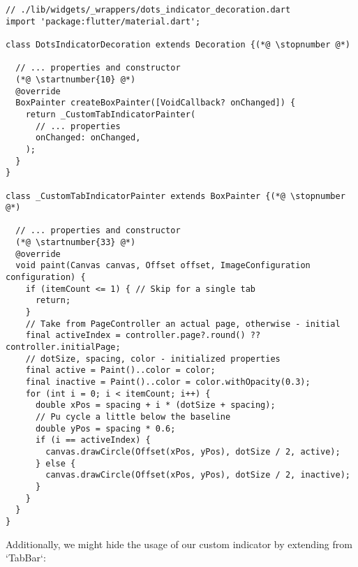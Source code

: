 \begin{lstlisting}
// ./lib/widgets/_wrappers/dots_indicator_decoration.dart
import 'package:flutter/material.dart';

class DotsIndicatorDecoration extends Decoration {(*@ \stopnumber @*)

  // ... properties and constructor
  (*@ \startnumber{10} @*)
  @override
  BoxPainter createBoxPainter([VoidCallback? onChanged]) {
    return _CustomTabIndicatorPainter(
      // ... properties
      onChanged: onChanged,
    );
  }
}

class _CustomTabIndicatorPainter extends BoxPainter {(*@ \stopnumber @*)

  // ... properties and constructor
  (*@ \startnumber{33} @*)
  @override
  void paint(Canvas canvas, Offset offset, ImageConfiguration configuration) {
    if (itemCount <= 1) { // Skip for a single tab
      return;
    }
    // Take from PageController an actual page, otherwise - initial
    final activeIndex = controller.page?.round() ?? controller.initialPage;
    // dotSize, spacing, color - initialized properties
    final active = Paint()..color = color;
    final inactive = Paint()..color = color.withOpacity(0.3);
    for (int i = 0; i < itemCount; i++) {
      double xPos = spacing + i * (dotSize + spacing);
      // Pu cycle a little below the baseline
      double yPos = spacing * 0.6; 
      if (i == activeIndex) {
        canvas.drawCircle(Offset(xPos, yPos), dotSize / 2, active);
      } else {
        canvas.drawCircle(Offset(xPos, yPos), dotSize / 2, inactive);
      }
    }
  }
}
\end{lstlisting}

\noindent Additionally, we might hide the usage of our custom indicator by extending from `TabBar`:

